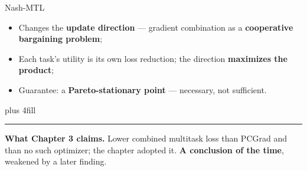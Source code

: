 \documentclass{beamer}
\begin{document}
\begin{frame}{Nash-MTL}
    \begin{itemize}
        \item Changes the \textbf{update direction} --- gradient combination as a
              \textbf{cooperative bargaining problem};
        \item Each task's utility is its own loss reduction; the direction
              \textbf{maximizes the product};
        \item Guarantee: a \textbf{Pareto-stationary point} --- necessary, not sufficient.
    \end{itemize}

    \vskip 0pt plus 4fill
    {\color{secondaryshade}\rule{\linewidth}{0.6pt}}
    \vspace{1mm}
    {\small\textbf{What Chapter 3 claims.} Lower combined multitask loss than PCGrad and than no such optimizer; the chapter adopted it.
        \textbf{A conclusion of the time}, weakened by a later finding.\par}

\end{frame}
\end{document}
